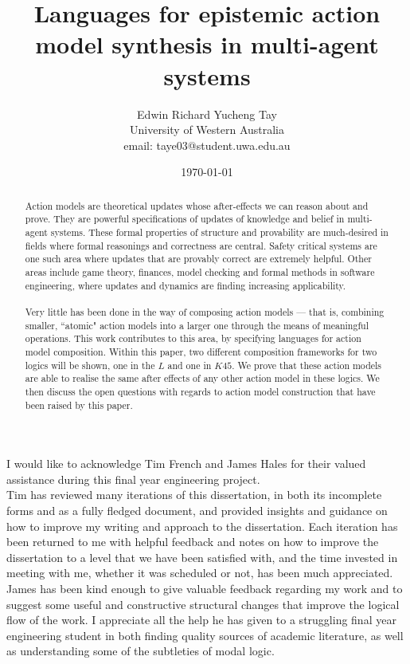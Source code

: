 \documentclass{cshonours}
\title{Languages for epistemic action model synthesis in multi-agent systems}
\author{Edwin Richard Yucheng Tay \\
University of Western Australia \\
email: taye03@student.uwa.edu.au }
\date{\today}
\numberwithin{equation}{chapter}
\newcommand{\lang}{\ensuremath{L}}
\newcommand{\langKFF}{\ensuremath{K45}}
\begin{document}
\maketitle

\begin{abstract}

Action models are theoretical updates whose after-effects we can reason about
and prove.
They are powerful specifications of updates of knowledge and belief in
multi-agent systems.
These formal properties of structure and provability are much-desired in
fields where formal reasonings and correctness are central.
Safety critical systems are one such area where updates that are provably
correct are extremely helpful.
Other areas include game theory, finances, model checking and formal methods in
software engineering, where updates and dynamics are finding increasing applicability.\\
\\
Very little has been done in the way of composing action models --- that is, combining smaller,
``atomic" action models into a larger one through the means of meaningful operations.
This work contributes to this area, by specifying languages for action model composition.
Within this paper, two different composition frameworks for two logics will be shown, one in
the $\lang$ and one in $\langKFF$.
We prove that these action models are able to realise the same after effects of
any other action model in these logics.
We then discuss the open questions with regards to action model construction
that have been raised by this paper.

\end{abstract}

\begin{acknowledgements}
I would like to acknowledge Tim French and James Hales for their valued assistance during this final
year engineering project.\\
Tim has reviewed many iterations of this dissertation, in both its incomplete forms and as a fully
fledged document, and provided insights and guidance on how to improve my writing and approach to
the dissertation.
Each iteration has been returned to me with helpful feedback and notes on how to improve the
dissertation to a level that we have been satisfied with, and the time invested in meeting with me,
whether it was scheduled or not, has been much appreciated.\\
James has been kind enough to give valuable feedback regarding my work and to suggest some useful and
constructive structural changes that improve the logical flow of the work.
I appreciate all the help he has given to a struggling final year engineering student in both
finding quality sources of academic literature, as well as understanding some of the subtleties of modal logic.
\end{acknowledgements}
\end{document}
